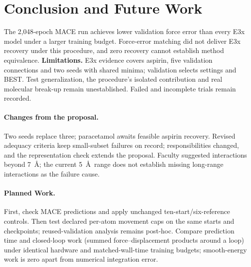 \documentclass{article}
\begin{document}
\section{Conclusion and Future Work}
The 2,048-epoch MACE run achieves lower validation force error than every E3x model under a larger training budget. Force-error matching did not deliver E3x recovery under this procedure, and zero recovery cannot establish method equivalence. \textbf{Limitations.} E3x evidence covers aspirin, five validation connections and two seeds with shared minima; validation selects settings and BEST. Test generalization, the procedure's isolated contribution and real molecular break-up remain unestablished. Failed and incomplete trials remain recorded.

\paragraph{Changes from the proposal.}
Two seeds replace three; paracetamol awaits feasible aspirin recovery. Revised adequacy criteria keep small-subset failures on record; responsibilities changed, and the representation check extends the proposal. Faculty suggested interactions beyond 7~\AA; the current 5~\AA\ range does not establish missing long-range interactions as the failure cause.
\paragraph{Planned Work.} First, check MACE predictions and apply unchanged ten-start/six-reference controls. Then test declared per-atom movement caps on the same starts and checkpoints; reused-validation analysis remains post-hoc. Compare prediction time and closed-loop work (summed force--displacement products around a loop) under identical hardware and matched-wall-time training budgets; smooth-energy work is zero apart from numerical integration error.
\end{document}
